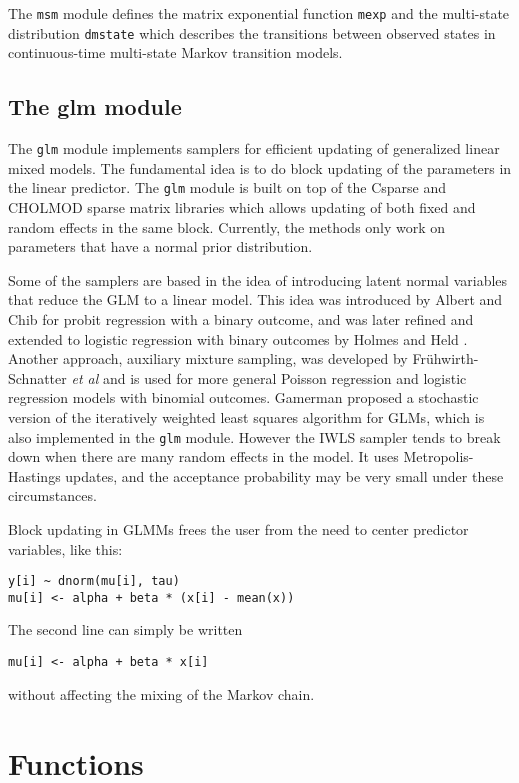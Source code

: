 \documentclass[11pt, a4paper, titlepage]{report}
\begin{document}
The \verb+msm+ module defines the matrix exponential function
\verb+mexp+ and the multi-state distribution \verb+dmstate+ which
describes the transitions between observed states in continuous-time
multi-state Markov transition models. 

\section{The glm module}

The \verb+glm+ module implements samplers for efficient updating of
generalized linear mixed models.  The fundamental idea is to do block
updating of the parameters in the linear predictor.  The \verb+glm+
module is built on top of the \textsf{Csparse} and \textsf{CHOLMOD}
sparse matrix libraries
\cite{Davis2006, Davis1999} which allows updating of both fixed and random
effects in the same block. Currently, the methods only work on
parameters that have a normal prior distribution.

Some of the samplers are based in the idea of introducing latent
normal variables that reduce the GLM to a linear model. This idea was
introduced by Albert and Chib \cite{AlbertChib93} for probit
regression with a binary outcome, and was later refined and extended
to logistic regression with binary outcomes by Holmes and Held
\cite{HolmesHeld06}. Another approach, auxiliary mixture sampling,
was developed by Fr{\"u}hwirth-Schnatter {\em et al}
\cite{Fruhwirth-Schnatter09} and is used for more general Poisson
regression and logistic regression models with binomial outcomes.
Gamerman \cite{Gamerman97} proposed a stochastic version of the iteratively
weighted least squares algorithm for GLMs, which is also implemented
in the \verb+glm+ module. However the IWLS sampler tends to break down
when there are many random effects in the model. It uses
Metropolis-Hastings updates, and the acceptance probability may be
very small under these circumstances.

Block updating in GLMMs frees the user from the need to center
predictor variables, like this:
\begin{verbatim}
y[i] ~ dnorm(mu[i], tau)
mu[i] <- alpha + beta * (x[i] - mean(x))
\end{verbatim}
The second line can simply be written
\begin{verbatim}
mu[i] <- alpha + beta * x[i]
\end{verbatim}
without affecting the mixing of the Markov chain.  

\chapter{Functions}
\label{section:functions}
\end{document}
